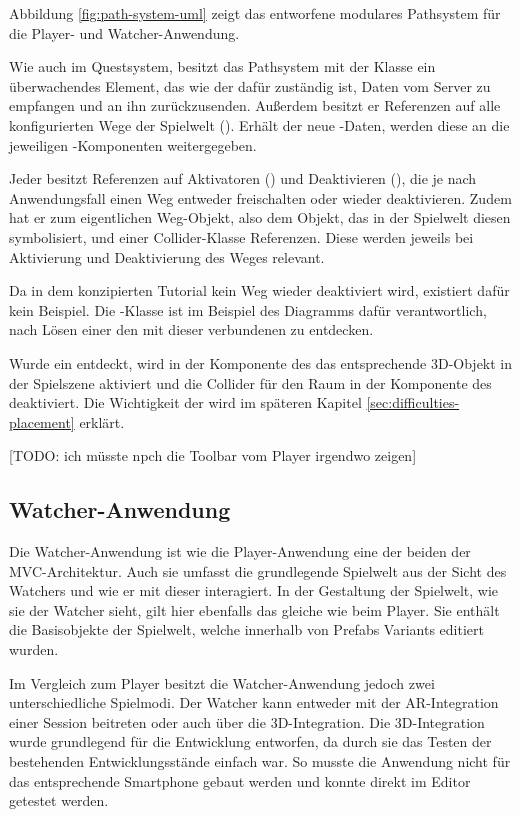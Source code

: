 Abbildung \ref{fig:path-system-uml} zeigt das entworfene modulares Pathsystem für die Player- und Watcher-Anwendung.

Wie auch im Questsystem, besitzt das Pathsystem mit der Klasse  ein überwachendes Element, das wie der  dafür zuständig ist, Daten vom Server zu empfangen und an ihn zurückzusenden. Außerdem besitzt er Referenzen auf alle konfigurierten Wege der Spielwelt (). Erhält der  neue -Daten, werden diese an die jeweiligen -Komponenten weitergegeben.

Jeder  besitzt Referenzen auf Aktivatoren () und Deaktivieren (), die je nach Anwendungsfall einen Weg entweder freischalten oder wieder deaktivieren. Zudem hat er zum eigentlichen Weg-Objekt, also dem Objekt, das in der Spielwelt diesen  symbolisiert, und einer Collider-Klasse Referenzen. Diese werden jeweils bei Aktivierung und Deaktivierung des Weges relevant.

Da in dem konzipierten Tutorial kein Weg wieder deaktiviert wird, existiert dafür kein Beispiel. Die -Klasse ist im Beispiel des Diagramms dafür verantwortlich, nach Lösen einer  den mit dieser  verbundenen  zu entdecken.

Wurde ein  entdeckt, wird in der Komponente des  das entsprechende \ac{3D}-Objekt in der Spielszene aktiviert und die Collider für den Raum in der Komponente des  deaktiviert. Die Wichtigkeit der  wird im späteren Kapitel \ref{sec:difficulties-placement} erklärt. 

[TODO: ich müsste npch die Toolbar vom Player irgendwo zeigen]

\subsection{Watcher-Anwendung}
Die Watcher-Anwendung ist wie die Player-Anwendung eine der beiden  der \ac{MVC}-Architektur. Auch sie umfasst die grundlegende Spielwelt aus der Sicht des Watchers und wie er mit dieser interagiert. In der Gestaltung der Spielwelt, wie sie der Watcher sieht, gilt hier ebenfalls das gleiche wie beim Player. Sie enthält die Basisobjekte der Spielwelt, welche innerhalb von Prefabs Variants editiert wurden.

Im Vergleich zum Player besitzt die Watcher-Anwendung jedoch zwei unterschiedliche Spielmodi. Der Watcher kann entweder mit der \ac{AR}-Integration einer Session beitreten oder auch über die \ac{3D}-Integration. Die \ac{3D}-Integration wurde grundlegend für die Entwicklung entworfen, da durch sie das Testen der bestehenden Entwicklungsstände einfach war. So musste die Anwendung nicht für das entsprechende Smartphone gebaut werden und konnte direkt im Editor getestet werden.

